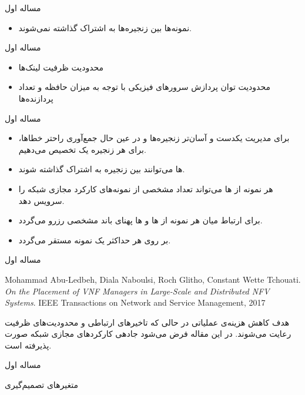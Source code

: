 \documentclass{beamer}
\makeatletter
\newcommand{\RTList}{\raggedleft\rightskip\@totalleftmargin}
\makeatother
\begin{document}
\begin{persian}
\begin{frame}{مساله اول}
\begin{itemize}
        \item نمونه‌ها بین زنجیره‌ها به اشتراک گذاشته نمی‌شوند.
    \end{itemize}
\end{frame}
\begin{frame}{مساله اول}
    \begin{itemize}\RTList{}
        \item محدودیت ظرفیت لینک‌ها
        \item محدودیت توان پردازش سرورهای فیزیکی با توجه به میزان حافظه و تعداد پردازنده‌ها
    \end{itemize}
\end{frame}
\begin{frame}{مساله اول}
    \begin{itemize}\RTList{}
        \item برای مدیریت یکدست و آسان‌تر زنجیره‌ها و در عین حال جمع‌آوری راحتر خطاها، برای هر زنجیره یک  تخصیص می‌دهیم.
        \item {}ها می‌توانند بین زنجیره به اشتراک گذاشته شوند.
        \item هر نمونه از ها می‌تواند تعداد مشخصی از نمونه‌های کارکرد مجازی شبکه را سرویس دهد. 
        \item برای ارتباط میان هر نمونه از ها و ها پهنای باند مشخصی رزرو می‌گردد.
        \item بر روی هر  حداکثر یک نمونه  مستقر می‌گردد.
    \end{itemize}
\end{frame}
\begin{frame}{مساله اول}
    \begin{latin}\begin{thebibliography}{9}
        Mohammad Abu-Ledbeh, Diala Naboulsi, Roch Glitho, Constant Wette Tchouati.
        \textit{On the Placement of VNF Managers in Large-Scale and Distributed NFV Systems}. 
        IEEE Transactions on Network and Service Management, 2017
    \end{thebibliography}\end{latin}
    \par
    هدف کاهش هزینه‌ی عملیاتی در حالی که تاخیرهای ارتباطی و محدودیت‌های ظرفیت رعایت می‌شوند.
    در این مقاله فرض می‌شود جادهی کارکردهای مجازی شبکه صورت پذیرفته است.
\end{frame}
\begin{frame}{مساله اول}
    \par
    متغیرهای تصمیم‌گیری
    \begin{latin}\begin{tabular}{c p{10cm}}

\end{tabular}
\end{latin}
\end{frame}
\end{persian}
\end{document}
